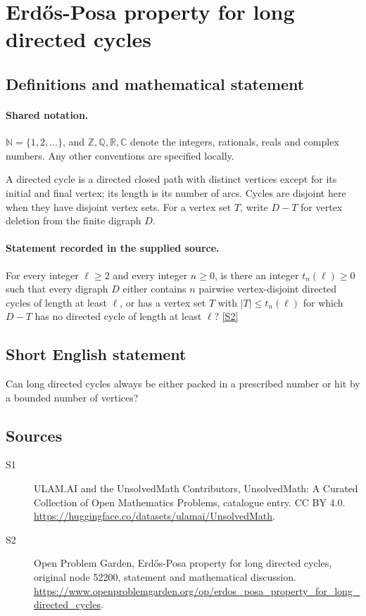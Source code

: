 \documentclass[11pt]{article}
\newcommand{\sref}[2]{\hyperlink{source:#1:#2}{[S#2]}}
\begin{document}
\section{Erdős-Posa property for long directed cycles}\label{statement}

\subsection{Definitions and mathematical statement}

\paragraph{Shared notation.}$\mathbb N=\{1,2,\ldots\}$, and $\mathbb Z,\mathbb Q,\mathbb R,\mathbb C$ denote the integers, rationals, reals and complex numbers. Any other conventions are specified locally.


A directed cycle is a directed closed path with distinct vertices except for its initial and final vertex; its length is its number of arcs. Cycles are disjoint here when they have disjoint vertex sets. For a vertex set $T$, write $D-T$ for vertex deletion from the finite digraph $D$.
\paragraph{Statement recorded in the supplied source.}
For every integer $\ell\ge2$ and every integer $n\ge0$, is there an integer $t_n(\ell)\ge0$ such that every digraph $D$ either contains $n$ pairwise vertex-disjoint directed cycles of length at least $\ell$, or has a vertex set $T$ with $|T|\le t_n(\ell)$ for which $D-T$ has no directed cycle of length at least $\ell$? \sref{statement}{2}
\subsection{Short English statement}
Can long directed cycles always be either packed in a prescribed number or hit by a bounded number of vertices?
\subsection{Sources}
\begin{description}
\item[\hypertarget{source:statement:1}{S1}] ULAM.AI and the UnsolvedMath Contributors, UnsolvedMath: A Curated Collection of Open Mathematics Problems, catalogue entry. CC BY 4.0. \url{https://huggingface.co/datasets/ulamai/UnsolvedMath}.
\item[\hypertarget{source:statement:2}{S2}] Open Problem Garden, Erdős-Posa property for long directed cycles, original node 52200, statement and mathematical discussion. \url{https://www.openproblemgarden.org/op/erdos_posa_property_for_long_directed_cycles}.
\end{description}
\label{end:statement}
\end{document}
